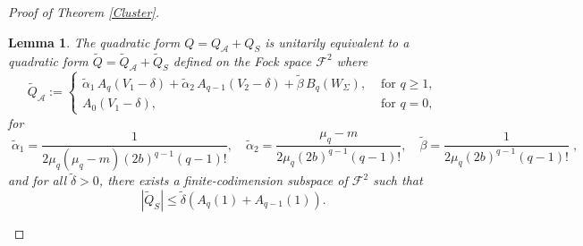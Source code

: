\documentclass[11pt,a4paper,reqno,oneside]{amsproc}
\numberwithin{equation}{section}
\newtheorem{lemma}[definition]{Lemma}
\begin{document}
\begin{proof}[Proof of Theorem \ref{Cluster}]
\begin{lemma}\label{lem55} The quadratic form $Q=Q_{\mathcal A}+Q_S$ is unitarily equivalent to a quadratic form $\widetilde Q= \widetilde Q_{\mathcal A} + \widetilde Q_{S}$ defined on the Fock space $\mathcal F^2$ where 
\[
\widetilde Q_{\mathcal A} := \left\{ \begin{array}{ll}
\widetilde\alpha_1\,A_q(V_1-\delta) + \widetilde\alpha_2\,A_{q-1}(V_2-\delta) 
+ \widetilde\beta\,B_q(W_\Sigma), & \text{ for } q\geq 1,  \\
A_0(V_1-\delta),  & \text{ for } q = 0, 
\end{array} \right.
\]
for
\[
\;\widetilde\alpha_1 = \frac{1}{2\mu_q(\mu_q-m)(2b)^{q-1}(q-1)!}, \quad
\widetilde\alpha_2 = \frac{\mu_q-m}{2\mu_q(2b)^{q-1}(q-1)!}, \quad
\widetilde\beta = \frac{1}{2\mu_q(2b)^{q-1}(q-1)!}\;,
\]
and for all  $ \tilde\delta >0$, there exists a finite-codimension subspace of $\mathcal{F}^{2}$ such that
\[
|\widetilde Q_S | \leq \tilde\delta ( A_q(1) + A_{q-1}(1) ).
\]
\end{lemma}







\end{proof}
\end{document}
